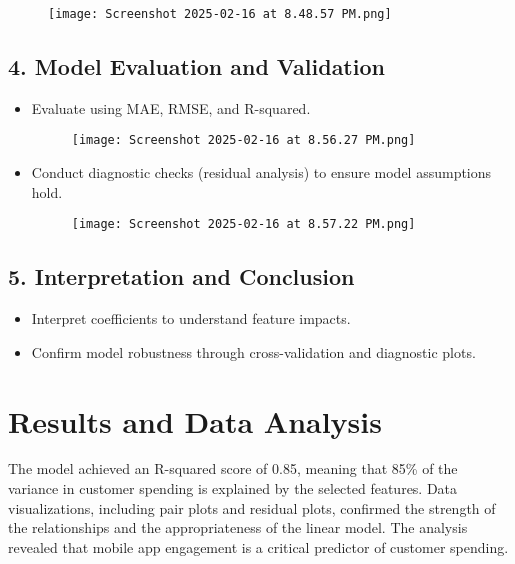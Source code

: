 \documentclass[12pt]{article}
\begin{document}
\begin{figure}[H]
    \centering
    \texttt{[image: Screenshot 2025-02-16 at 8.48.57 PM.png]}
\end{figure}




\subsection*{4. Model Evaluation and Validation}
\begin{itemize}[leftmargin=*, label=\textbullet]
    \item Evaluate using MAE, RMSE, and R-squared.

    \begin{figure}[H]
        \centering
        \texttt{[image: Screenshot 2025-02-16 at 8.56.27 PM.png]}
    \end{figure}

    
    \item Conduct diagnostic checks (residual analysis) to ensure model assumptions hold.


    \begin{figure}[H]
        \centering
        \texttt{[image: Screenshot 2025-02-16 at 8.57.22 PM.png]}
    \end{figure}

    
\end{itemize}

\subsection*{5. Interpretation and Conclusion}
\begin{itemize}[leftmargin=*, label=\textbullet]
    \item Interpret coefficients to understand feature impacts.
    \item Confirm model robustness through cross-validation and diagnostic plots.
\end{itemize}

\section{Results and Data Analysis}
The model achieved an R-squared score of 0.85, meaning that 85\% of the variance in customer spending is explained by the selected features. Data visualizations, including pair plots and residual plots, confirmed the strength of the relationships and the appropriateness of the linear model. The analysis revealed that mobile app engagement is a critical predictor of customer spending.
\end{document}
